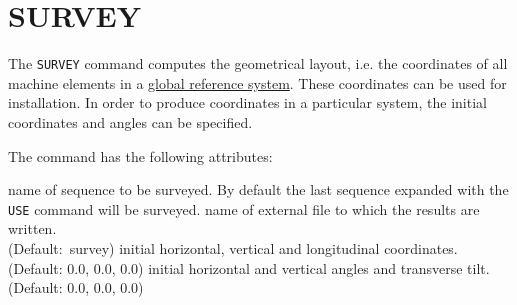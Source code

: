  
\chapter{SURVEY}
\label{chap:survey}

The \texttt{SURVEY} command computes the geometrical layout, i.e. the
coordinates of all machine elements in a 
\hyperref[sec:global_ref]{global reference system}. These
coordinates can be used for installation. In order to produce
coordinates in a particular system, the initial coordinates and angles
can be specified. 


The command has the following attributes:
\begin{madlist}
     name of sequence to be surveyed. By default the
  last sequence expanded with the \texttt{USE} command will be surveyed.  
     name of external file to which the results are
  written.\\ (Default:~survey)
   initial horizontal, vertical and longitudinal
  coordinates.\\ (Default: 0.0, 0.0, 0.0) 
   initial horizontal and vertical angles and
  transverse tilt.\\ (Default: 0.0, 0.0, 0.0)
\end{madlist}



